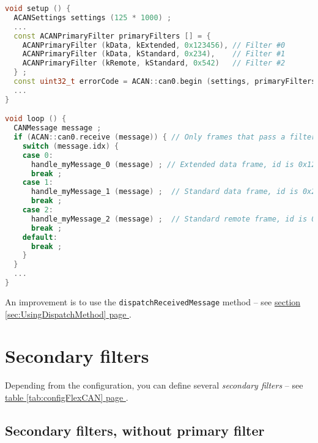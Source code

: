 \documentclass[9pt, a4paper, obeyspaces, openany]{extarticle}
\newcommand \sectionLabel[2]{\section{#1}\label{sec:#2}}
\newcommand\refSectionPage[1]{\hyperref[sec:#1]{section \ref*{sec:#1} page \pageref{sec:#1}}}
\newcommand\refTableauPage[1]{\hyperref[tab:#1]{table \ref*{tab:#1} page \pageref{tab:#1}}}
\begin{document}
{ \small\begin{lstlisting}[language=c++]
void setup () {
  ACANSettings settings (125 * 1000) ;
  ...
  const ACANPrimaryFilter primaryFilters [] = {
    ACANPrimaryFilter (kData, kExtended, 0x123456), // Filter #0
    ACANPrimaryFilter (kData, kStandard, 0x234),    // Filter #1
    ACANPrimaryFilter (kRemote, kStandard, 0x542)   // Filter #2
  } ;
  const uint32_t errorCode = ACAN::can0.begin (settings, primaryFilters, 3) ;
  ...
}

void loop () {
  CANMessage message ;
  if (ACAN::can0.receive (message)) { // Only frames that pass a filter are retrieved
    switch (message.idx) {
    case 0:
      handle_myMessage_0 (message) ; // Extended data frame, id is 0x123456
      break ;
    case 1:
      handle_myMessage_1 (message) ;  // Standard data frame, id is 0x234
      break ;
    case 2:
      handle_myMessage_2 (message) ;  // Standard remote frame, id is 0x542
      break ;
    default:
      break ;
    }
  }
  ...
}
\end{lstlisting}}

An improvement is to use the \texttt{dispatchReceivedMessage} method -- see \refSectionPage{UsingDispatchMethod}.











\sectionLabel{Secondary filters}{secondaryFilters}

Depending from the configuration, you can define several \emph{secondary filters} -- see \refTableauPage{configFlexCAN}.



\subsection{Secondary filters, without primary filter}
\end{document}

